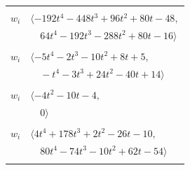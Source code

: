 \documentclass[11pt]{article}
\begin{document}
\begin{longtable}{@{}ll@{}}
\addlinespace[2pt]
\multicolumn{2}{@{}p{0.97\textwidth}@{}}{$i=74$, $D_i=4$, $e_i=2$, $\rho_{ij}$: $2{:}3, \allowbreak 13{:}1, \allowbreak 35{:}1, \allowbreak 36{:}1, \allowbreak 39{:}2, \allowbreak 41{:}1, \allowbreak 48{:}2, \allowbreak 54{:}1, \allowbreak 57{:}3, \allowbreak 58{:}1, \allowbreak 65{:}3, \allowbreak 68{:}2$}\\
$w_i$ & $\langle -192t^{4}-448t^{3}+96t^{2}+80t-48,$\\
 & $\quad 64t^{4}-192t^{3}-288t^{2}+80t-16\rangle$\\
\addlinespace[2pt]
\multicolumn{2}{@{}p{0.97\textwidth}@{}}{$i=75$, $D_i=13$, $\rho_{ij}$: $39{:}2, \allowbreak 65{:}2$}\\
$w_i$ & $\langle -5t^{4}-2t^{3}-10t^{2}+8t+5,$\\
 & $\quad -t^{4}-3t^{3}+24t^{2}-40t+14\rangle$\\
\addlinespace[2pt]
\multicolumn{2}{@{}p{0.97\textwidth}@{}}{$i=76$, $D_i=1$, $\rho_{ij}$: $0{:}3, \allowbreak 51{:}3, \allowbreak 56{:}3, \allowbreak 59{:}1, \allowbreak 65{:}1$}\\
$w_i$ & $\langle -4t^{2}-10t-4,$\\
 & $\quad 0\rangle$\\
\addlinespace[2pt]
\multicolumn{2}{@{}p{0.97\textwidth}@{}}{$i=77$, $D_i=1$, $\rho_{ij}$: $2{:}1, \allowbreak 7{:}1, \allowbreak 8{:}1, \allowbreak 19{:}2, \allowbreak 32{:}2, \allowbreak 44{:}2, \allowbreak 45{:}2, \allowbreak 56{:}3, \allowbreak 58{:}2, \allowbreak 63{:}3, \allowbreak 64{:}2$}\\
$w_i$ & $\langle 4t^{4}+178t^{3}+2t^{2}-26t-10,$\\
 & $\quad 80t^{4}-74t^{3}-10t^{2}+62t-54\rangle$\\
\addlinespace[2pt]
\end{longtable}
\endgroup
\end{document}
